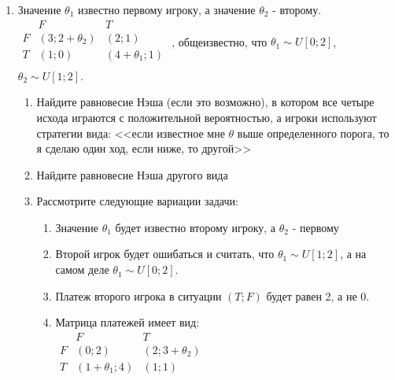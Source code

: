 \documentclass[pdftex,12pt,a4paper]{article}
\begin{document}
\begin{enumerate}
\item Значение $\theta _1 $ известно первому игроку, а значение $\theta _2 $ - второму.\\
$\begin{array}{c|cc}
    {} &  F & T   \\
\hline
    F &  {\left( {3;2 + \theta _2 } \right)} & {\left( {2;1} \right)}   \\
    T &  {\left( {1;0} \right)} & {\left( {4 + \theta _1 ;1} \right)}   \\
\end{array}$
, общеизвестно, что $\theta _1  \sim U\left[ {0;2} \right]$, $\theta _2  \sim U\left[ {1;2} \right]$.
\begin{enumerate}
\item Найдите равновесие Нэша (если это возможно), в котором все четыре исхода играются с положительной вероятностью, а игроки используют стратегии вида: <<если известное мне $\theta$ выше определенного порога, то я сделаю один ход, если ниже, то другой>> 
\item Найдите равновесие Нэша другого вида 
\item Рассмотрите следующие вариации задачи:
\begin{enumerate}
\item Значение $\theta _1 $ будет известно второму игроку, а $\theta _2 $ - первому
\item Второй игрок будет ошибаться и считать, что $\theta _1  \sim U\left[ {1;2} \right]$, а на самом деле $\theta _1  \sim U\left[ {0;2} \right]$.
\item Платеж второго игрока в ситуации $\left( {T;F} \right)$ будет равен 2, а не 0.
\item Матрица платежей имеет вид:\\
$\begin{array}{c|cc}
    {} &  F & T   \\
\hline
    F &  {\left( {0;2} \right)} & {\left( {2;3 + \theta _2 } \right)}   \\
    T &  {\left( {1 + \theta _1 ;4} \right)} & {\left( {1;1} \right)}   \\
\end{array}$ 
\end{enumerate}
\end{enumerate}


\end{enumerate}
\end{document}
